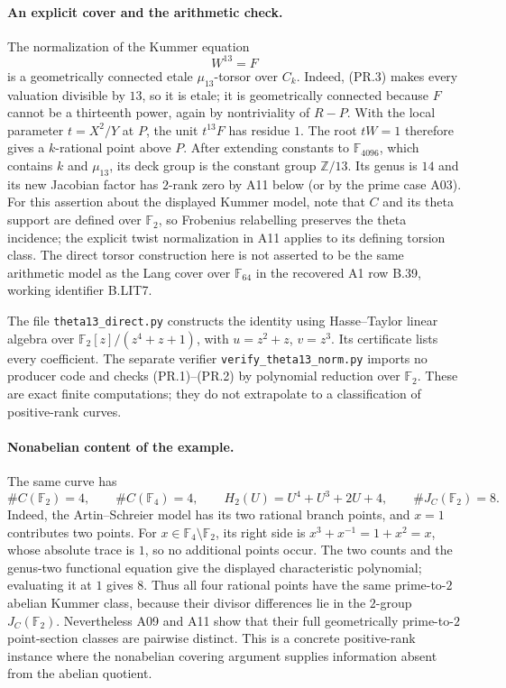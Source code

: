 \documentclass[11pt,a4paper]{article}
\begin{document}
\paragraph{An explicit cover and the arithmetic check.}
The normalization of the Kummer equation
\[
 W^{13}=F
\]
is a geometrically connected etale $\mu_{13}$-torsor over $C_k$.
Indeed, (PR.3) makes every valuation divisible by $13$, so it is
etale; it is geometrically connected because $F$ cannot be a
thirteenth power, again by nontriviality of $R-P$. With the local
parameter $t=X^2/Y$ at $P$, the unit $t^{13}F$ has residue $1$.
The root $tW=1$ therefore gives a $k$-rational point above $P$.
After extending constants to $\mathbb F_{4096}$, which contains
$k$ and $\mu_{13}$, its deck group is the constant group
$\mathbb Z/13$. Its genus is $14$ and its new Jacobian factor has
$2$-rank zero by A11 below (or by the prime case A03).
For this assertion about the displayed Kummer model, note that
$C$ and its theta support are defined over $\mathbb F_2$, so
Frobenius relabelling preserves the theta incidence; the explicit
twist normalization in A11 applies to its defining torsion class.
The direct torsor construction here is not asserted to be the same
arithmetic model as the Lang cover over $\mathbb F_{64}$ in the
recovered A1 row B.39, working identifier B.LIT7.

The file \texttt{theta13\_direct.py} constructs the identity using
Hasse--Taylor linear algebra over
$\mathbb F_2[z]/(z^4+z+1)$, with $u=z^2+z$, $v=z^3$.
Its certificate lists every coefficient. The separate verifier
\texttt{verify\_theta13\_norm.py} imports no producer code and
checks (PR.1)--(PR.2) by polynomial reduction over $\mathbb F_2$.
These are exact finite computations; they do not extrapolate to a
classification of positive-rank curves.

\paragraph{Nonabelian content of the example.}
The same curve has
\[
 \#C(\mathbb F_2)=4,\qquad \#C(\mathbb F_4)=4,\qquad
 H_2(U)=U^4+U^3+2U+4,\qquad \#J_C(\mathbb F_2)=8.
 \tag{PR.10}
\]
Indeed, the Artin--Schreier model has its two rational branch
points, and $x=1$ contributes two points. For
$x\in\mathbb F_4\setminus\mathbb F_2$, its right side is
$x^3+x^{-1}=1+x^2=x$,
whose absolute trace is $1$, so no additional points occur.
The two counts and the genus-two functional equation give the
displayed characteristic polynomial; evaluating it at $1$ gives
$8$. Thus all four rational points have the same prime-to-$2$
abelian Kummer class, because their divisor differences lie in
the $2$-group $J_C(\mathbb F_2)$. Nevertheless A09 and A11 show
that their full geometrically prime-to-$2$ point-section classes
are pairwise distinct. This is a concrete positive-rank instance
where the nonabelian covering argument supplies information
absent from the abelian quotient.
\end{document}
